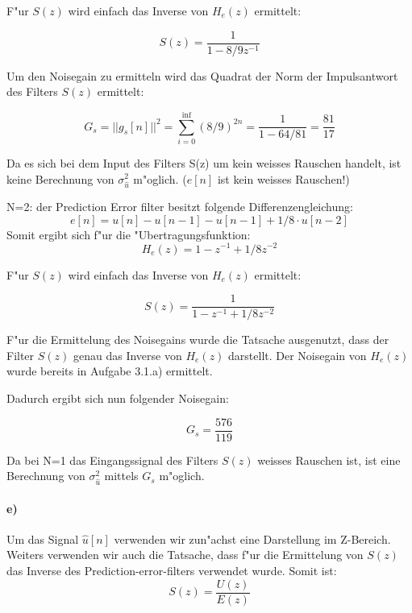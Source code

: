 F"ur $S(z)$ wird einfach das Inverse von $H_e(z)$ ermittelt:

\begin{equation}
 S(z) = \frac{1}{1-8/9z^{-1}}
\end{equation}

Um den Noisegain zu ermitteln wird das Quadrat der Norm der Impulsantwort des Filters $S(z)$ ermittelt:

\begin{equation}
 G_s = ||g_s[n]||^2 = \sum^{\inf}_{i=0} (8/9)^{2n} = \frac{1}{1-64/81} = \frac{81}{17}
\end{equation}


Da es sich bei dem Input des Filters S(z) um kein weisses Rauschen handelt, ist keine Berechnung
von $\sigma_{\hat{u}}^2$ m"oglich. ($e[n]$ ist kein weisses Rauschen!)


N=2: der Prediction Error filter besitzt folgende Differenzengleichung:
\begin{equation}
 e[n] = u[n] - u[n-1] - u[n-1] + 1/8 \cdot u[n-2]
\end{equation}
Somit ergibt sich f"ur die "Ubertragungsfunktion:
\begin{equation}
 H_e(z) = 1-z^{-1} + 1/8z^{-2}
\end{equation}

F"ur $S(z)$ wird einfach das Inverse von $H_e(z)$ ermittelt:

\begin{equation}
 S(z) = \frac{1}{1-z^{-1} + 1/8z^{-2}}
\end{equation}


F"ur die Ermittelung des Noisegains wurde die Tatsache ausgenutzt, dass der Filter $S(z)$ genau
das Inverse von $H_e(z)$ darstellt. Der Noisegain von $H_e(z)$ wurde bereits in Aufgabe 3.1.a) ermittelt.

Dadurch ergibt sich nun folgender Noisegain:

\begin{equation}
 G_s = \frac{576}{119}
\end{equation}

Da bei N=1 das Eingangssignal des Filters $S(z)$ weisses Rauschen ist, ist eine Berechnung von 
$\sigma_{\hat{u}}^2$ mittels $G_s$ m"oglich.



\paragraph{e)}

Um das Signal $\hat{u}[n]$ verwenden wir zun"achst eine Darstellung im Z-Bereich. Weiters 
verwenden wir auch die Tatsache, dass f"ur die Ermittelung von $S(z)$ das Inverse des Prediction-error-filters
verwendet wurde. Somit ist:
\begin{equation}
S(z) = \frac{U(z)}{E(z)} 
\end{equation}


